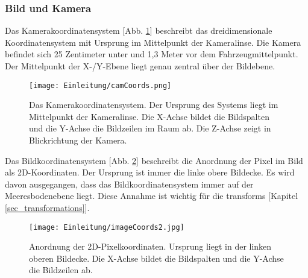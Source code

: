 \subsubsection{Bild und Kamera}
\label{sec_img_cam_coords}
Das Kamerakoordinatensystem [Abb. \ref{CamKoords}] beschreibt das dreidimensionale Koordinatensystem mit Ursprung im Mittelpunkt der Kameralinse. Die Kamera befindet sich 25 Zentimeter unter und 1,3 Meter vor dem Fahrzeugmittelpunkt. Der Mittelpunkt der X-/Y-Ebene liegt genau zentral über der Bildebene.
\begin{figure}[H]
	\centering
	\texttt{[image: Einleitung/camCoords.png]}
	\caption[Das Kamerakoordinatensystem]{Das Kamerakoordinatensystem. Der Ursprung des Systems liegt im Mittelpunkt der Kameralinse. Die X-Achse bildet die Bildspalten und die Y-Achse die Bildzeilen im Raum ab. Die Z-Achse zeigt in Blickrichtung der Kamera.}
	\label{CamKoords}
\end{figure}

Das Bildkoordinatensystem [Abb. \ref{imageKoords}] beschreibt die Anordnung der Pixel im Bild als 2D-Koordinaten. Der Ursprung ist immer die linke obere Bildecke. Es wird davon ausgegangen, dass das Bildkoordinatensystem immer auf der Meeresbodenebene liegt. Diese Annahme ist wichtig für die \glspl{transform} [Kapitel \ref{sec_transformations}].
\begin{figure}[H]
	\centering
	\texttt{[image: Einleitung/imageCoords2.jpg]}
	\caption[Das Bildkoordinatensystem]{Anordnung der 2D-Pixelkoordinaten. Ursprung liegt in der linken oberen Bildecke. Die X-Achse bildet die Bildspalten und die Y-Achse die Bildzeilen ab.}
	\label{imageKoords}
\end{figure}

